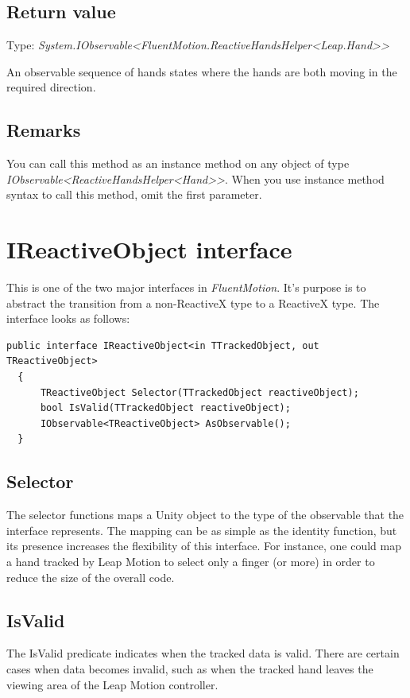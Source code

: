 \documentclass[12pt,a4paper,twoside]{report}
\begin{document}
\subsection{Return value}
Type: \textit{System.IObservable<FluentMotion.ReactiveHandsHelper<Leap.Hand>{}>}

An observable sequence of hands states where the hands are both moving in the required direction.

\subsection{Remarks}
You can call this method as an instance method on any object of type \textit{IObservable<ReactiveHandsHelper<Hand>{}>}. When you use instance method syntax to call this method, omit the first parameter.

\section{IReactiveObject interface}
This is one of the two major interfaces in \textit{FluentMotion}. It's purpose is to abstract the transition from a non-ReactiveX type to a ReactiveX type. The interface looks as follows:

\begin{lstlisting}[caption=IReactiveObject interface]
  public interface IReactiveObject<in TTrackedObject, out TReactiveObject>
  {
      TReactiveObject Selector(TTrackedObject reactiveObject);
      bool IsValid(TTrackedObject reactiveObject);
      IObservable<TReactiveObject> AsObservable();
  }
\end{lstlisting}

\subsection{Selector}
The selector functions maps a Unity object to the type of the observable that the interface represents. The mapping can be as simple as the identity function, but its presence increases the flexibility of this interface. For instance, one could map a hand tracked by Leap Motion to select only a finger (or more) in order to reduce the size of the overall code.

\subsection{IsValid}
The IsValid predicate indicates when the tracked data is valid. There are certain cases when data becomes invalid, such as when the tracked hand leaves the viewing area of the Leap Motion controller.
\end{document}
